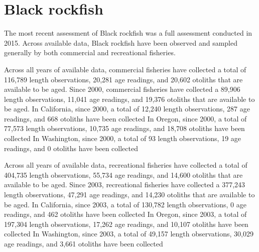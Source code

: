 \documentclass[11pt,
  english,
  letterpaper,
]{article}
\begin{document}

\hypertarget{black-rockfish}{%
\section{Black rockfish}\label{black-rockfish}}

\leavevmode\tagmcend\tagstructend


The most recent assessment of Black rockfish was a full assessment conducted in 2015. Across available data, Black rockfish have been observed and sampled generally by both commercial and recreational fisheries.

\leavevmode\tagmcend\tagstructend\par


Across all years of available data, commercial fisheries have collected a total of 116,789 length observations, 20,281 age readings, and 20,602 otoliths that are available to be aged. Since 2000, commercial fisheries have collected a 89,906 length observations, 11,041 age readings, and 19,376 otoliths that are available to be aged. In California, since 2000, a total of 12,240 length observations, 287 age readings, and 668 otoliths have been collected In Oregon, since 2000, a total of 77,573 length observations, 10,735 age readings, and 18,708 otoliths have been collected In Washington, since 2000, a total of 93 length observations, 19 age readings, and 0 otoliths have been collected

\leavevmode\tagmcend\tagstructend\par


Across all years of available data, recreational fisheries have collected a total of 404,735 length observations, 55,734 age readings, and 14,600 otoliths that are available to be aged. Since 2003, recreational fisheries have collected a 377,243 length observations, 47,291 age readings, and 14,230 otoliths that are available to be aged. In California, since 2003, a total of 130,782 length observations, 0 age readings, and 462 otoliths have been collected In Oregon, since 2003, a total of 197,304 length observations, 17,262 age readings, and 10,107 otoliths have been collected In Washington, since 2003, a total of 49,157 length observations, 30,029 age readings, and 3,661 otoliths have been collected
\end{document}
